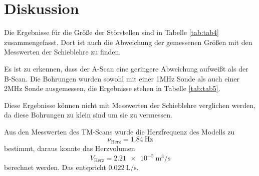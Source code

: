 \section{Diskussion}
\label{sec:Diskussion}

Die Ergebnisse für die Größe der Störstellen sind in Tabelle \ref{tab:tab4} zusammengefasst.
Dort ist auch die Abweichung der gemessenen Größen mit den Messwerten der
Schieblehre zu finden.


Es ist zu erkennen, dass der A-Scan eine geringere Abweichung aufweißt als der
B-Scan.
Die Bohrungen wurden sowohl mit einer 1\;MHz Sonde als auch einer 2\;MHz Sonde
ausgemessen, die Ergebnisse stehen in Tabelle \ref{tab:tab5}.

Diese Ergebnisse können nicht mit Messwerten der Schieblehre verglichen werden, da
diese Bohrungen zu klein sind um sie zu vermessen.

Aus den Messwerten des TM-Scans wurde die Herzfrequenz des Modells zu
\begin{equation}
  \nu_{\text{Herz}}=\SI{1,84}{\Hz}
\end{equation}
bestimmt, daraus konnte das Herzvolumen
\begin{equation}
  V_{\text{Herz}}=\SI{2,21e-5}{\m^{3}\per\s}
\end{equation}
berechnet werden. Das entspricht $\SI{0,022}{\liter\per\s}$.
